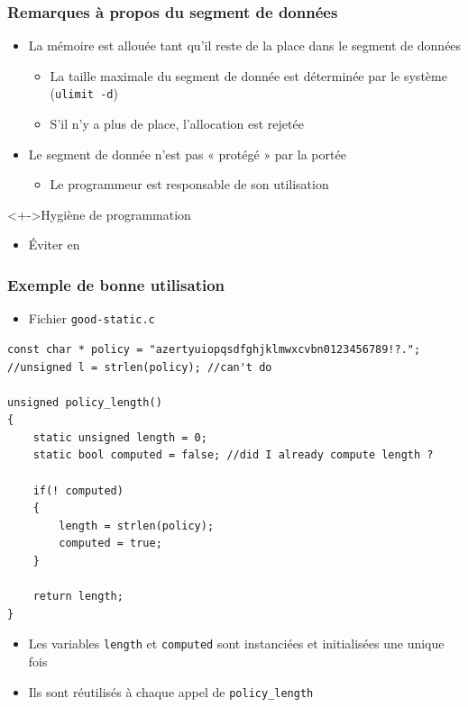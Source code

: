 \begin{frame}
\frametitle{Remarques à propos du segment de données}
\begin{itemize}[<+->]
\item La mémoire est allouée tant qu'il reste de la place dans le segment de données
	\begin{itemize}
	\item La taille maximale du segment de donnée est déterminée par le système (\texttt{ulimit -d})
	\item S'il n'y a plus de place, l'allocation est rejetée	
	\end{itemize}
\item Le segment de donnée n'est pas « protégé » par la portée
	\begin{itemize}
	\item Le programmeur est responsable de son utilisation
	\end{itemize}
\end{itemize}
\begin{block}<+->{Hygiène de programmation}
	\begin{itemize}
	\item Éviter en \cpp
	\end{itemize}
\end{block}
\end{frame}

\begin{frame}[containsverbatim]
\frametitle{Exemple de bonne utilisation}
\begin{itemize}
\item Fichier \texttt{good-static.c}
\end{itemize}
\begin{lstlisting}
const char * policy = "azertyuiopqsdfghjklmwxcvbn0123456789!?.";
//unsigned l = strlen(policy); //can't do

unsigned policy_length()
{
    static unsigned length = 0;
    static bool computed = false; //did I already compute length ?
    
    if(! computed)
    {
        length = strlen(policy);
        computed = true;
    }
    
    return length;
}
\end{lstlisting}
\begin{itemize}
\item Les variables \texttt{length} et \texttt{computed} sont instanciées et initialisées une unique fois
\item Ils sont réutilisés à chaque appel de \texttt{policy\_length}
\end{itemize}
\end{frame}

